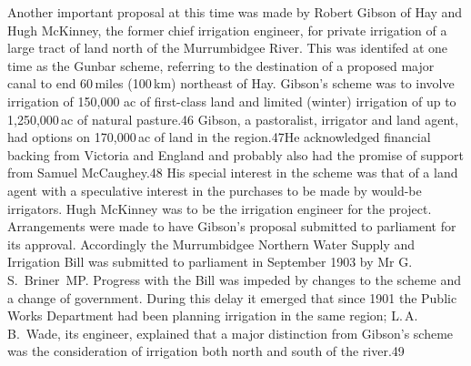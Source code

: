 Another important proposal at this time was made by Robert Gibson of
Hay and Hugh McKinney, the former chief irrigation engineer, for
private irrigation of a large tract of land north of the Murrumbidgee
River. This was identifed at one time as the Gunbar scheme, referring
to the destination of a proposed major canal to end 60\,miles
(100\,km) northeast of Hay. Gibson's scheme was to involve irrigation
of 150,000 ac of first-class land and limited (winter) irrigation of
up to 1,250,000\,ac of natural pasture.46 Gibson, a pastoralist,
irrigator and land agent, had options on 170,000\,ac of land in the
region.47He acknowledged financial backing from Victoria and England
and probably also had the promise of support from Samuel McCaughey.48
His special interest in the scheme was that of a land agent with a
speculative interest in the purchases to be made by would-be
irrigators.  Hugh McKinney was to be the irrigation engineer for the
project.  Arrangements were made to have Gibson's proposal submitted
to parliament for its approval.  Accordingly the Murrumbidgee Northern
Water Supply and Irrigation Bill was submitted to parliament in
September 1903 by Mr G.\,S.~Briner~MP.  Progress with the Bill was
impeded by changes to the scheme and a change of government. During
this delay it emerged that since 1901 the Public Works Department had
been planning irrigation in the same region; L.\,A.\,B.~Wade, its
engineer, explained that a major distinction from Gibson's scheme was
the consideration of irrigation both north and south of the river.49

